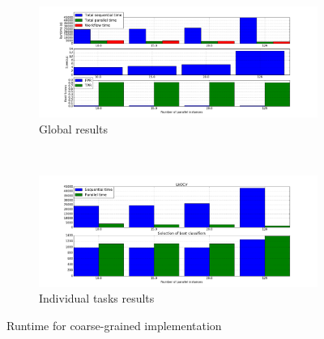 \documentclass[10pt, conference, compsocconf]{IEEEtran}
\begin{document}
\begin{figure}
  \begin{center}
    \begin{subfigure}{0.5\textwidth}
      \captionsetup{skip=0pt}
      \centering
      \includegraphics[width=\textwidth]{Figures/times_fixedparams_global_bars.png}
      \caption{\footnotesize Global results \label{subfig:granularity_glob}}
    \end{subfigure}\\
  \begin{subfigure}{0.5\textwidth}
    \captionsetup{skip=0pt}
    \centering
    \includegraphics[width=\textwidth]{Figures/times_fixedparams_individual_bars.png}
    \caption{\footnotesize Individual tasks results \label{subfig:granularity_ind}}
  \end{subfigure}
\end{center}
\caption{Runtime for coarse-grained implementation \label{fig:granularity}}
\end{figure}
\end{document}
